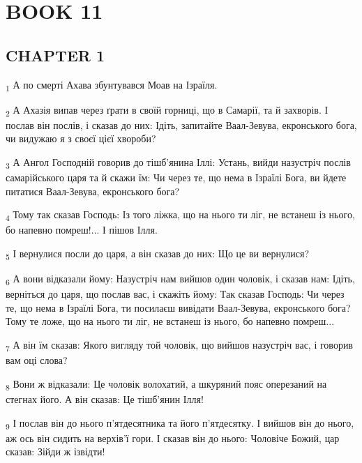 \section{BOOK 11}
\subsection{CHAPTER 1}
\begin{tcolorbox}
\textsubscript{1} А по смерті Ахава збунтувався Моав на Ізраїля.
\end{tcolorbox}
\begin{tcolorbox}
\textsubscript{2} А Ахазія випав через ґрати в своїй горниці, що в Самарії, та й захворів. І послав він послів, і сказав до них: Ідіть, запитайте Ваал-Зевува, екронського бога, чи видужаю я з своєї цієї хвороби?
\end{tcolorbox}
\begin{tcolorbox}
\textsubscript{3} А Ангол Господній говорив до тішб'янина Іллі: Устань, вийди назустріч послів самарійського царя та й скажи їм: Чи через те, що нема в Ізраїлі Бога, ви йдете питатися Ваал-Зевува, екронського бога?
\end{tcolorbox}
\begin{tcolorbox}
\textsubscript{4} Тому так сказав Господь: Із того ліжка, що на нього ти ліг, не встанеш із нього, бо напевно помреш!... І пішов Ілля.
\end{tcolorbox}
\begin{tcolorbox}
\textsubscript{5} І вернулися посли до царя, а він сказав до них: Що це ви вернулися?
\end{tcolorbox}
\begin{tcolorbox}
\textsubscript{6} А вони відказали йому: Назустріч нам вийшов один чоловік, і сказав нам: Ідіть, верніться до царя, що послав вас, і скажіть йому: Так сказав Господь: Чи через те, що нема в Ізраїлі Бога, ти посилаєш вивідати Ваал-Зевува, екронського бога? Тому те ложе, що на нього ти ліг, не встанеш із нього, бо напевно помреш...
\end{tcolorbox}
\begin{tcolorbox}
\textsubscript{7} А він їм сказав: Якого вигляду той чоловік, що вийшов назустріч вас, і говорив вам оці слова?
\end{tcolorbox}
\begin{tcolorbox}
\textsubscript{8} Вони ж відказали: Це чоловік волохатий, а шкуряний пояс оперезаний на стегнах його. А він сказав: Це тішб'янин Ілля!
\end{tcolorbox}
\begin{tcolorbox}
\textsubscript{9} І послав він до нього п'ятдесятника та його п'ятдесятку. І вийшов він до нього, аж ось він сидить на верхів'ї гори. І сказав він до нього: Чоловіче Божий, цар сказав: Зійди ж ізвідти!
\end{tcolorbox}
